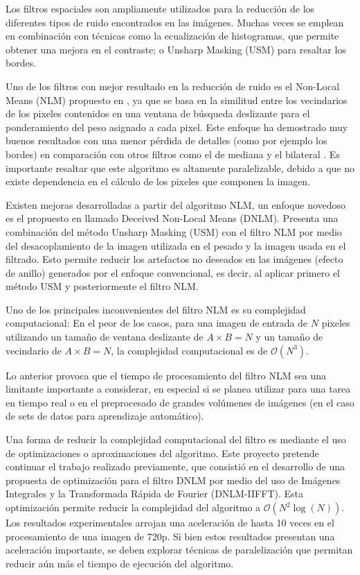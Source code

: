 Los filtros espaciales son ampliamente utilizados para la reducci\'on de los diferentes tipos de ruido encontrados en las im\'agenes. Muchas veces se emplean en combinación con t\'ecnicas como la ecualizaci\'on de histogramas, que permite obtener una mejora en el contraste; o Unsharp Masking (USM) para resaltar los bordes.

Uno de los filtros con mejor resultado en la reducción de ruido es el Non-Local Means (NLM) propuesto en \textcite{1467423}, ya que se basa en la similitud entre los vecindarios de los pixeles contenidos en una ventana de búsqueda deslizante para el ponderamiento del peso asignado a cada pixel. Este enfoque ha demostrado muy buenos resultados con una menor p\'erdida de detalles (como por ejemplo los bordes) en comparaci\'on con otros filtros como el de mediana y el bilateral \cite{calderon2016first}. Es importante resaltar que este algoritmo es altamente paralelizable, debido a que no existe dependencia en el c\'alculo de los pixeles que componen la imagen. 

Existen mejoras desarrolladas a partir del algoritmo NLM, un enfoque novedoso es el propuesto en \textcite{7160148} llamado Deceived Non-Local Means (DNLM). Presenta una combinaci\'on del m\'etodo Unsharp Masking (USM) con el filtro NLM por medio del desacoplamiento de la imagen utilizada en el pesado y la imagen usada en el filtrado. Esto permite reducir los artefactos no deseados en las im\'agenes (efecto de anillo) generados por el enfoque convencional, es decir, al aplicar primero el m\'etodo USM y posteriormente el filtro NLM.  

Uno de los principales inconvenientes del filtro NLM es su complejidad computacional: En el peor de los casos, para una imagen de entrada de $N$ pixeles utilizando un tamaño de ventana deslizante de $A\times B = N$ y un tamaño de vecindario de $A\times B = N$, la complejidad computacional es de $\mathcal{O}(N^{3})$. 

Lo anterior provoca que el tiempo de procesamiento del filtro NLM sea una limitante importante a considerar, en especial si se planea utilizar para una tarea en tiempo real o en el preprocesado de grandes vol\'umenes de im\'agenes (en el caso de sets de datos para aprendizaje autom\'atico). 

Una forma de reducir la complejidad computacional del filtro es mediante el uso de optimizaciones o aproximaciones del algoritmo. Este proyecto pretende continuar el trabajo realizado previamente, que consisti\'o en el desarrollo de una propuesta de optimizaci\'on para el filtro DNLM por medio del uso de Im\'agenes Integrales y la Transformada R\'apida de Fourier (DNLM-IIFFT). Esta optimizaci\'on permite reducir la complejidad del algoritmo a  $\mathcal{O}(N^{2}\log(N))$. Los resultados experimentales arrojan una aceleraci\'on de hasta 10 veces en el procesamiento de una imagen de 720p. Si bien estos resultados presentan una aceleraci\'on importante, se deben explorar t\'ecnicas de paralelizaci\'on que permitan reducir a\'un m\'as el tiempo de ejecuci\'on del algoritmo. 

